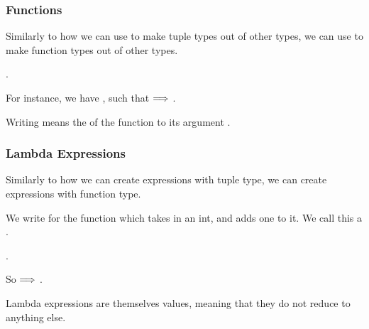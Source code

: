 \documentclass[aspectratio=169]{beamer}
\begin{document}
\begin{frame}[fragile]
  \frametitle{Functions}

  Similarly to how we can use \code{*} to make tuple types out of other types, we can use \code{->} to make 
  function types out of other types.

  \vspace{\fill}

  .

  \vspace{\fill}

  For instance, we have , such that  $\Longrightarrow$ .

  \vspace{\fill}


  \vspace{5pt}

  Writing  means the  of the function  to its argument .

  \vspace{\fill}

\end{frame}

\begin{frame}[fragile]
  \frametitle{Lambda Expressions}

  Similarly to how we can create expressions with tuple type, we can create expressions
  with function type.

  \vspace{\fill}

  We write  for the function which takes in an int, and adds one to it. 
  We call this a .

  \vspace{5pt}

  .

  \vspace{\fill}

  So  $\Longrightarrow$ .

  \vspace{\fill}

  Lambda expressions are themselves values, meaning that they do not reduce to anything else.
\end{frame}
\end{document}
